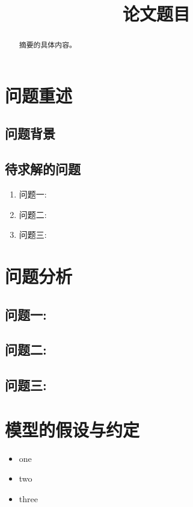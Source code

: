 \documentclass{cumcmthesis}
\title{论文题目}
\begin{document}
	\maketitle
	\begin{abstract}
		摘要的具体内容。
	\end{abstract}
	
	
	\section{问题重述}
		\subsection{问题背景}
		\par 
		\subsection{待求解的问题}
		\par 
			\begin{enumerate}
				\item{问题一:}
				\item{问题二:}
				\item{问题三:}
			\end{enumerate}
	\section{问题分析}
		\subsection{问题一:}
		\subsection{问题二:}
		\subsection{问题三:}
	\section{模型的假设与约定}
		\begin{itemize}
			\item{} one
			\item{} two
			\item{} three
		\end{itemize}
\end{document}
